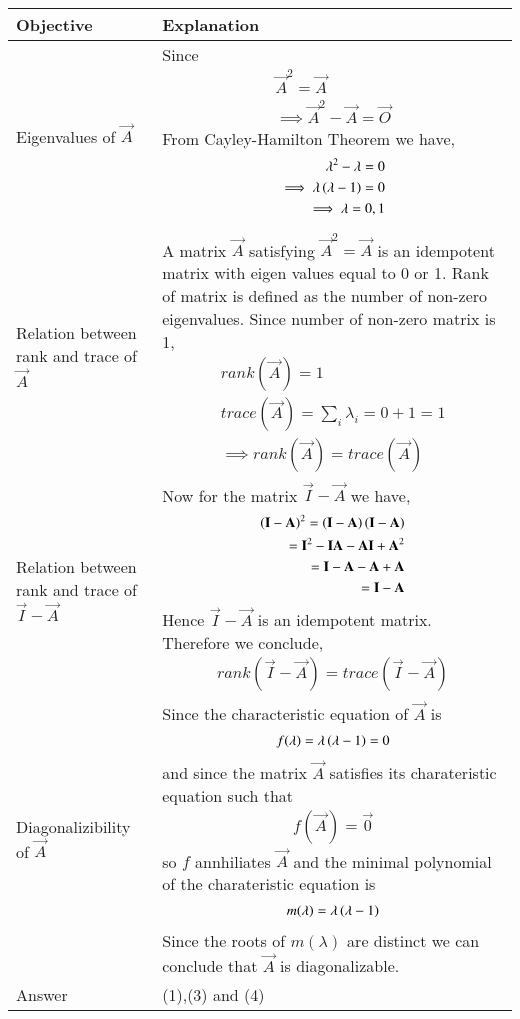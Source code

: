 \documentclass[journal,12pt,twocolumn]{IEEEtran}
\begin{document}
\begin{table}[htbp]
        \centering
	\begin{tabular}{|m{2.0in}|m{5.0in}|} \hline
		\textbf{Objective} & \textbf{Explanation} \\ \hline
		Eigenvalues of $\vec{A}$ & Since 
		\begin{align}
			\vec{A}^2=\vec{A} \\
		        \implies \vec{A}^2-\vec{A}=\vec{O}
		\end{align} 
From Cayley-Hamilton Theorem we have,
\begin{align}
        \lambda^2-\lambda=0 \\
        \implies \lambda\left(\lambda-1\right)=0 \\
        \implies \lambda=0,1
\end{align} \\ \hline
		Relation between rank and trace of $\vec{A}$ & A matrix $\vec{A}$ satisfying $\vec{A}^2=\vec{A}$ is an idempotent matrix with eigen values      
equal to 0 or 1. Rank of matrix is defined as the number of non-zero eigenvalues. Since number of non-zero matrix is 1,  
\begin{align}
	rank(\vec{A})=1 \\
	trace(\vec{A})=\sum_i \lambda_i = 0+1 =1 \\
	\implies rank(\vec{A})=trace(\vec{A})
\end{align} \\ \hline
Relation between rank and trace of $\vec{I}-\vec{A}$ & Now for the matrix $\vec{I}-\vec{A}$ we have,
\begin{align}
	\left(\mathbf{I}-\mathbf{A}\right)^2 = \left(\mathbf{I}-\mathbf{A}\right)\left(\mathbf{I}-\mathbf{A}\right)\\
	= \mathbf{I}^2-\mathbf{IA}-\mathbf{AI}+\mathbf{A}^2 \\
	= \mathbf{I}-\mathbf{A}-\mathbf{A}+\mathbf{A} \\
	= \mathbf{I}-\mathbf{A}
\end{align}
Hence $\vec{I}-\vec{A}$ is an idempotent matrix. Therefore we conclude,
\begin{align}
        rank(\vec{I}-\vec{A})=trace(\vec{I}-\vec{A})
\end{align} \\ \hline
		Diagonalizibility of $\vec{A}$ & Since the characteristic equation of $\vec{A}$ is
		\begin{align}
			f(\lambda)=\lambda \left(\lambda-1\right)=0
		\end{align}
		and since the matrix $\vec{A}$ satisfies its charateristic equation such that
		\begin{align}
			f(\vec{A})=\vec{0}
		\end{align}
		so $f$ annhiliates $\vec{A}$ and the minimal polynomial of the charateristic equation
		is
		\begin{align}
			m(\lambda)=\lambda \left(\lambda-1\right)
		\end{align}
		Since the roots of $m(\lambda)$ are distinct we can conclude that $\vec{A}$ is 
		diagonalizable.\\
		\hline
		Answer& (1),(3) and (4) \\ \hline
        \end{tabular}
        \caption{} \label{1}
\end{table}
\end{document}
